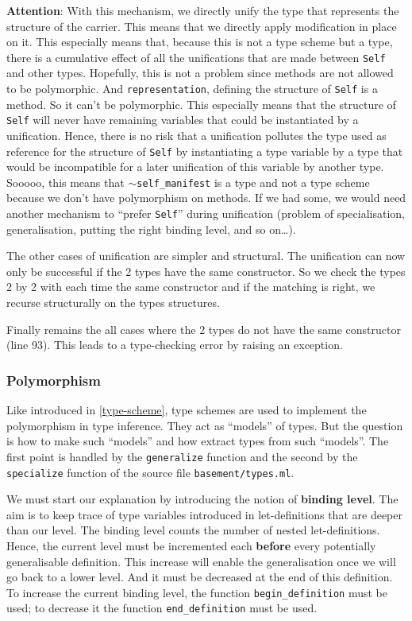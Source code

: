 {\bf Attention}: With this mechanism, we directly unify the type that
represents the structure of the carrier. This means that we directly
apply modification in place on it. This especially means that, because
this is not a type scheme but a type, there is a cumulative effect of
all the unifications that are made between {\tt Self} and other
types. Hopefully, this is not a problem since methods are not allowed
to be polymorphic. And {\tt representation}, defining the structure
of {\tt Self} is a method. So it can't be polymorphic. This especially
means that the structure of {\tt Self} will never have remaining
variables that could be instantiated by a unification. Hence, there is
no risk that a unification pollutes the type used as reference for the
structure of {\tt Self} by instantiating a type variable by a type
that would be incompatible for a later unification of this variable by
another type. Sooooo, this means that {\tt $\sim$self\_manifest} is a type
and not a type scheme because we don't have polymorphism on
methods. If we had some, we would need another mechanism to ``prefer
{\tt Self}'' during unification (problem of specialisation,
generalisation, putting the right binding level, and so on\ldots).


\medskip
The other cases of unification are simpler and structural. The
unification can now only be successful if the 2 types have the same
constructor. So we check the types 2 by 2 with each time the same
constructor and if the matching is right, we recurse structurally on
the types structures.

\medskip
Finally remains the all cases where the 2 types do not have the same
constructor (line 93). This leads to a type-checking error by raising
an exception.

\subsubsection{Polymorphism}
Like introduced in \ref{type-scheme}, type schemes are used to
implement the polymorphism in type inference. They act as ``models''
of types. But the question is how to make such ``models'' and how
extract types from such ``models''. The first point is handled by the
{\tt generalize} function and the second by the {\tt specialize}
function of the source file {\tt basement/types.ml}.

We must start our explanation by introducing the notion of
{\bf binding level}. The aim is to keep trace of type variables
introduced in let-definitions that are deeper than our level. The
binding level counts the number of nested let-definitions. Hence, the
current level must be incremented each {\bf before} every potentially
generalisable definition. This increase will enable the generalisation
once we will go back to a lower level. And it must be decreased at the
end of this definition. To increase the current binding level, the
function {\tt begin\_definition} must be used; to decrease it the
function {\tt end\_definition} must be used.

